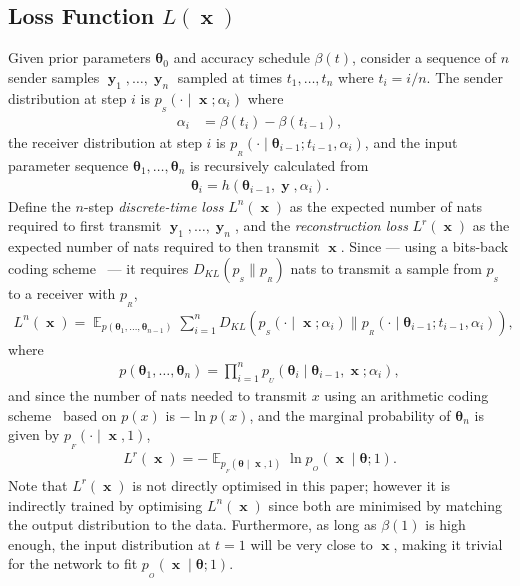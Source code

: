 \documentclass[11pt,table]{article}
\DeclareMathOperator*{\E}{\mathbb{E}}
\DeclareMathOperator{\x}{\mathbf{x}}
\DeclareMathOperator{\y}{\mathbf{y}}
\newcommand{\kl}[2]{D_{KL}\left(#1 \parallel #2\right)}
\newcommand{\tidx}[2]{#1_{#2}}
\renewcommand{\vec}[1]{\boldsymbol{#1}}
\newcommand{\pars}{\theta}
\newcommand{\parsn}{\vec{\pars}}
\newcommand{\parsnt}[1]{\tidx{\parsn}{#1}}
\newcommand{\alphat}[1]{\tidx{\alpha}{#1}}
\newcommand{\yt}[1]{\tidx{\y}{#1}}
\newcommand{\0}[1]{\constvec{0}{#1}}
\newcommand{\1}[1]{\constvec{1}{#1}}
\newcommand{\sender}[2]{p_{_S}\left(#1 \mid #2\right)}
\newcommand{\out}{p_{_O}}
\newcommand{\rec}{p_{_R}}
\newcommand{\flow}{p_{_F}}
\newcommand{\update}{p_{_U}}
\begin{document}
\subsection{Loss Function \texorpdfstring{$L(\x)$}{}}
Given prior parameters $\parsnt{0}$ and accuracy schedule $\beta(t)$, consider a sequence of $n$ sender samples $\yt{1},\dots,\yt{n}$ sampled at times $t_1,\dots,t_n$ where $t_i = i/n$. The sender distribution at step $i$ is $\sender{\cdot}{\x; \alpha_i}$
where
\begin{align}
\alphat{i} &= \beta(t_i) - \beta(t_{i-1}),\label{alpha_i}
\end{align}
the receiver distribution at step $i$ is $\rec(\cdot \mid \parsnt{i-1}; t_{i-1}, \alphat{i})$, 
and the input parameter sequence $\parsnt{1},\dots,\parsnt{n}$ is recursively calculated from
\begin{align}
\parsnt{i} = h(\parsnt{i-1}, \y, \alphat{i}).
\end{align}
Define the $n$-step \textit{discrete-time loss} $L^n(\x)$ as the expected number of nats required to first transmit $\yt{1},\dots,\yt{n}$, and the \textit{reconstruction loss} $L^r(\x)$ as the expected number of nats required to then transmit $\x$.
Since --- using a bits-back coding scheme~\citep{hinton1993keeping, duda2009asymmetric} --- it requires $\kl{p_{_S}}{\rec}$ nats to transmit a sample from $p_{_S}$ to a receiver with $\rec$,
\begin{align}
L^n(\x) = \E_{p(\parsnt{1},\dots,\parsnt{n-1})}\sum_{i=1}^n \kl{\sender{\cdot}{\x ; \alphat{i}}}{\rec(\cdot \mid \parsnt{i-1} ; t_{i-1}, \alphat{i})}\label{disc_t_loss_n_step},
\end{align}
where
\begin{align}
p(\parsnt{1},\dots,\parsnt{n}) = \prod_{i=1}^{n} \update(\parsnt{i}\mid \parsnt{i-1}, \x ; \alphat{i}),
\end{align}
and since the number of nats needed to transmit $x$ using an arithmetic coding scheme~\citep{witten1987arithmetic} based on $p(x)$ is $-\ln p(x)$, and the marginal probability of $\parsnt{n}$ is given by $\flow(\cdot \mid \x, 1)$,
\begin{align}
L^r(\x) = -\E_{\flow(\parsn \mid \x, 1)} \ln \out(\x \mid \parsn; 1).
\end{align}
Note that $L^r(\x)$ is not directly optimised in this paper; however it is indirectly trained by optimising $L^n(\x)$ since both are minimised by matching the output distribution to the data.
Furthermore, as long as $\beta(1)$ is high enough, the input distribution at $t=1$ will be very close to $\x$, making it trivial for the network to fit $\out(\x \mid \parsn; 1)$.
\end{document}
